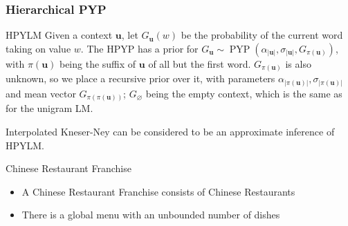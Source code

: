 \documentclass{beamer}
\begin{document}
\begin{frame}
    \frametitle{Hierarchical PYP}

    \begin{block}{HPYLM}
        Given a context $\mathbf{u}$, let $G_{\mathbf{u}}(w)$ be the probability of the current word taking on value $w$. 
        The HPYP has a prior for $G_{\mathbf{u}} \sim \operatorname{PYP}(\alpha_{|\mathbf{u}|},\sigma_{|\mathbf{u}|},G_{\pi(\mathbf{u})})$, with $\pi(\mathbf{u})$ being the suffix of $\mathbf{u}$ of all but the first word. 
        $G_{\pi(\mathbf{u})}$ is also unknown, so we place a recursive prior over it, with parameters $\alpha_{|\pi(\mathbf{u})|}, \sigma_{|\pi(\mathbf{u})|}$ 
        and mean vector $G_{\pi(\pi(\mathbf{u}))}$; $G_\varnothing$ being the empty context, which is the same as for the unigram LM.

        Interpolated Kneser-Ney can be considered to be an approximate inference of HPYLM.
    \end{block}

    \begin{block}{Chinese Restaurant Franchise}
        \begin{itemize}
            \item A Chinese Restaurant Franchise consists of Chinese Restaurants
            \item There is a global menu with an unbounded number of dishes
        \end{itemize}
    \end{block}
\end{frame}
\end{document}
